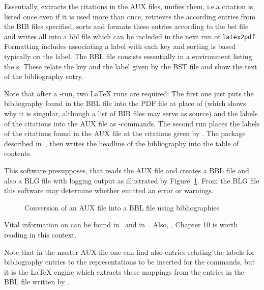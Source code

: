 Essentially,  extracts the citations in the AUX files, 
unifies them, i.e.\@ a citation is listed once even if it is used more than once, 
retrieves the according entries from the BIB files specified, 
sorts and formats these entries 
according to the \gls{bst} file and writes all into a \gls{bbl} file 
which can be included in the next run of \texttt{latex2pdf}. 
Formatting includes associating a label with each key 
and sorting is based typically on the label. 
The BBL file consists essentially in a  environment 
listing the s. 
These relate the key and the label given by the BST file 
and show the text of the bibliography entry. 

Note that after a -run, 
two \LaTeX{} runs are required: 
The first one just puts the bibliography found in the BBL file 
into the PDF file at place of  
(which shows why it is singular, although a list of BIB files may serve as source)
and the labels of the citations into the AUX file 
as -commands. 
The second run places the labels of the citations found in the AUX file 
at the citations given by . 
The package  described in~\cite{TocBibIndP}, 
then writes the headline of the bibliography 
into the table of contents.



This software presupposes, that  reads the AUX file 
and creates a BBL file and also a BLG file with logging output 
as illustrated by Figure~\ref{fig:aux2bbl}. 
From the BLG file this software may determine 
whether  emitted an error or warnings. 


\begin{figure}[htb]
\centering
{}
\caption{\label{fig:aux2bbl}
Conversion of an AUX file into a BBL file using bibliographies}
\end{figure}

Vital information on  can be found in~\cite{BibPat} 
and in~\cite{BibMar}. 
Also, \cite{Gra}, Chapter 10 is worth reading in this context. 

Note that in the master AUX file one can find also entries  
relating the labels for bibliography entries to the representations 
to be inserted for the  commands, 
but it is the \LaTeX{} engine which extracts these mappings 
from the  entries in the BBL file written by . 

